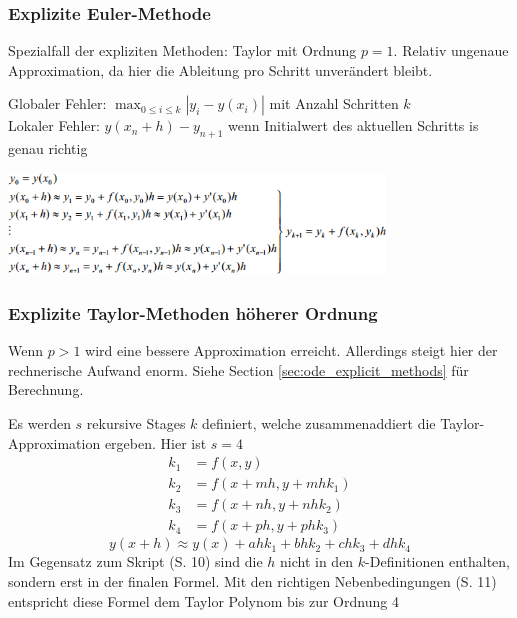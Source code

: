     
    
    
    \begin{minipage}{8cm}
      \subsubsection{Explizite Euler-Methode}
        Spezialfall der expliziten Methoden: Taylor mit Ordnung $p=1$. Relativ ungenaue Approximation,
        da hier die Ableitung pro Schritt unverändert bleibt. 
        
        Globaler Fehler: $\max_{0 \leq i \leq k} |y_i - y(x_i)|$ mit Anzahl Schritten $k$\\
        Lokaler Fehler: $y(x_n+h) - y_{n+1}$ wenn Initialwert des aktuellen Schritts is genau richtig
    \end{minipage}
    \hspace{8mm}
    \begin{minipage}{11cm}
      \includegraphics[width=10cm]{./bilder/ode_euler.png}
    \end{minipage}
      
    \subsubsection{Explizite Taylor-Methoden höherer Ordnung}
      Wenn $p > 1$ wird eine bessere Approximation erreicht. Allerdings steigt hier der rechnerische
      Aufwand enorm. Siehe Section \ref{sec:ode_explicit_methods} für Berechnung.
      
      
      Es werden $s$ rekursive Stages $k$ definiert, welche zusammenaddiert die Taylor-Approximation ergeben.
      Hier ist $s=4$
      \begin{align*}
        k_1 &= f(x,y)\\
        k_2 &= f(x + m h, y+m h k_1)\\
        k_3 &= f(x + n h, y+n h  k_2)\\
        k_4 &= f(x + p h, y+p h k_3) 
      \end{align*}     
      $$y(x+h) \approx y(x) + a h k_1 + b h k_2 + c h k_3 + d h k_4 $$ 
      Im Gegensatz zum Skript (S. 10) sind die 
      $h$ nicht in den $k$-Definitionen enthalten, sondern erst in der finalen Formel. Mit den richtigen Nebenbedingungen (S. 11) 
      entspricht diese Formel dem Taylor Polynom bis zur Ordnung 4
      
